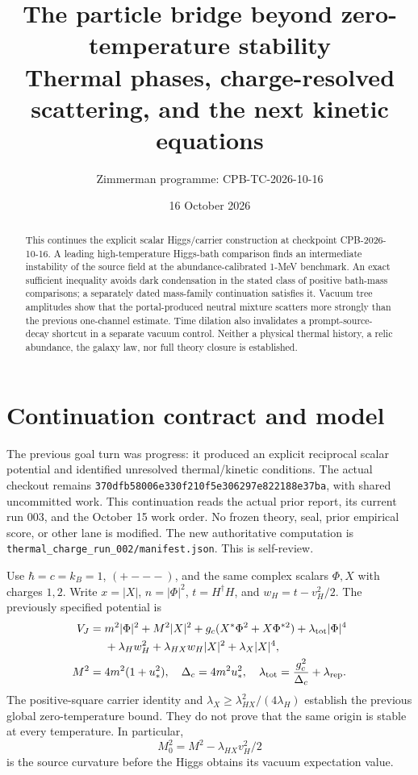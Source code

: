 \documentclass[11pt]{article}
\title{The particle bridge beyond zero-temperature stability\\
Thermal phases, charge-resolved scattering, and the next kinetic equations}
\author{Zimmerman programme: CPB-TC-2026-10-16}
\date{16 October 2026}
\newcommand{\lp}{\lambda_{HX}}
\newcommand{\lt}{\lambda_{\rm tot}}
\begin{document}
\maketitle
\begin{abstract}
This continues the explicit scalar Higgs/carrier construction at checkpoint
CPB-2026-10-16. A leading high-temperature Higgs-bath comparison finds an
intermediate instability of the source field at the abundance-calibrated
1-MeV benchmark. An exact sufficient inequality avoids dark condensation in
the stated class of positive bath-mass comparisons; a separately dated
mass-family continuation satisfies it. Vacuum tree amplitudes show that the
portal-produced neutral mixture scatters more strongly than the previous
one-channel estimate. Time dilation also invalidates a prompt-source-decay
shortcut in a separate vacuum control. Neither a physical thermal history,
a relic abundance, the galaxy law, nor full theory closure is established.
\end{abstract}

\section{Continuation contract and model}
The previous goal turn was progress: it produced an explicit reciprocal
scalar potential and identified unresolved thermal/kinetic conditions.
The actual checkout remains
\texttt{370dfb58006e330f210f5e306297e822188e37ba}, with shared uncommitted
work. This continuation reads the actual prior report, its current run 003,
and the October 15 work order. No frozen theory, seal, prior empirical score,
or other lane is modified. The new authoritative computation is
\texttt{thermal\_charge\_run\_002/manifest.json}. This is self-review.

Use $\hbar=c=k_B=1$, $(+---)$, and the same complex scalars $\Phi,X$ with
charges $1,2$. Write $x=|X|$, $n=|\Phi|^2$, $t=H^\dagger H$, and
$w_H=t-v_H^2/2$. The previously specified potential is
\begin{align}
 V_J={}&m^2|\Phi|^2+M^2|X|^2
 +g_c(X^*\Phi^2+X\Phi^{*2})+\lt|\Phi|^4\\
 &+\lambda_Hw_H^2+\lp w_H|X|^2+\lambda_X|X|^4,\nonumber\\
 M^2={}&4m^2(1+u_*^2),\quad \Delta_c=4m^2u_*^2,\quad
 \lt=\frac{g_c^2}{\Delta_c}+\lambda_{\rm rep}.
\end{align}
The positive-square carrier identity and
$\lambda_X\ge\lp^2/(4\lambda_H)$ establish the previous global
zero-temperature bound. They do not prove that the same origin is stable
at every temperature. In particular,
\begin{equation}
 M_0^2=M^2-\lp v_H^2/2
\end{equation}
is the source curvature before the Higgs obtains its vacuum expectation value.
\end{document}
